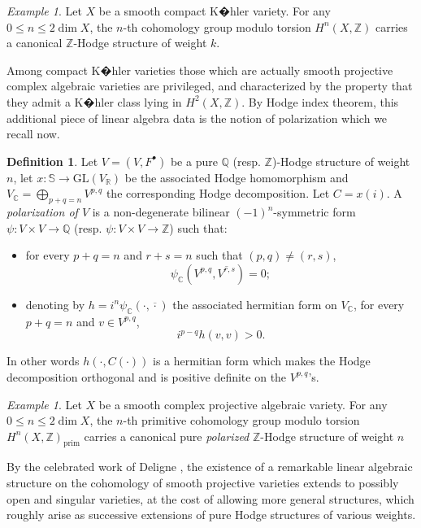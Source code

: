 \documentclass[10pt]{article}
\numberwithin{equation}{subsection}
\theoremstyle{plain}
\theoremstyle{definition}
\newtheorem{definition}[theorem]{Definition}
\theoremstyle{remark}
\newtheorem{example}[theorem]{Example}
\newcommand{\Z}{\mathbb Z}
\newcommand{\Q}{\mathbb Q}
\newcommand{\C}{\mathbb C}
\newcommand{\R}{\mathbb R}
\newcommand{\s}{\mathbb S}
\newcommand{\bul}{\bullet}
\begin{document}
\begin{example}
Let $X$ be a smooth compact K�hler variety. For any $0 \leqslant n \leqslant 2\dim X$, the $n$-th cohomology group modulo torsion $H^n(X,\Z)$ carries a canonical $\Z$-Hodge structure of weight $k$.
\end{example}
Among compact K�hler varieties those which are actually smooth projective complex algebraic varieties are privileged, and characterized by the property that they admit a K�hler class lying in $H^2(X,\Z)$. By Hodge index theorem, this additional piece of linear algebra data is the notion of polarization which we recall now.
\begin{definition}\label{pol}
Let $V = (V,F^\bul)$ be a pure $\Q$ (resp. $\Z$)-Hodge structure of weight $n$, let $x : \s \rightarrow \mathrm{GL}(V_\R)$ be the associated Hodge homomorphism and $V_\C = \bigoplus_{p+q = n}V^{p,q}$ the corresponding Hodge decomposition. Let $C = x(i)$. A \textit{polarization of $V$} is a non-degenerate bilinear $(-1)^n$-symmetric form $\psi : V \times V \rightarrow \Q$ (resp. $\psi : V \times V \rightarrow \Z$) such that:
\begin{itemize}
\item for every $p+q = n$ and $r+s = n$ such that $(p,q) \neq (r,s)$, 
\begin{equation}\label{HR1}
\psi_\C(V^{p,q}, \overline{V^{r,s}}) = 0;
\end{equation}
\item denoting by $h = i^{n}\psi_\C(\cdot, \overline{\cdot})$ the associated hermitian form on $V_\C$, for every $p+q = n$ and $v \in V^{p,q}$,
\begin{equation}\label{HR2}
i^{p-q}h(v,v) > 0.
\end{equation}
\end{itemize}
In other words $h(\cdot, C(\cdot))$ is a hermitian form which makes the Hodge decomposition orthogonal and is positive definite on the $V^{p,q}$'s.
\end{definition}
\begin{example}
Let $X$ be a smooth complex projective algebraic variety. For any $0 \leqslant n \leqslant 2\dim X$, the $n$-th primitive cohomology group modulo torsion $H^n(X,\Z)_{\mathrm{prim}}$ carries a canonical pure \textit{polarized} $\Z$-Hodge structure of weight $n$
\end{example}
By the celebrated work of Deligne \cite{hodge2, hodge3}, the existence of a remarkable linear algebraic structure on the cohomology of smooth projective varieties extends to possibly open and singular varieties, at the cost of allowing more general structures, which roughly arise as successive extensions of pure Hodge structures of various weights.
\end{document}
